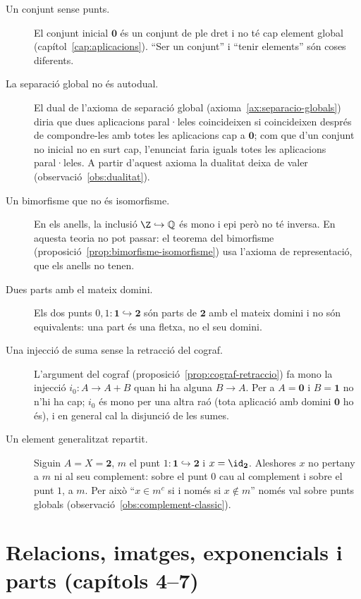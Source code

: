 \begin{description}
\item[Un conjunt sense punts.] El conjunt inicial \(\mathbf0\) és un conjunt
de ple dret i no té cap element global
(capítol~\ref{cap:aplicacions}). \enquote{Ser un conjunt} i \enquote{tenir
elements} són coses diferents.

\item[La separació global no és autodual.] El dual de l'axioma de separació
global (axioma~\ref{ax:separacio-globals}) diria que dues aplicacions
paral·leles coincideixen si coincideixen després de compondre-les amb
totes les aplicacions cap a \(\mathbf0\); com que d'un conjunt no inicial no
en surt cap, l'enunciat faria iguals totes les aplicacions paral·leles. A
partir d'aquest axioma la dualitat deixa de valer
(observació~\ref{obs:dualitat}).

\item[Un bimorfisme que no és isomorfisme.] En els anells, la inclusió
\(\Z\hookrightarrow\mathbb Q\) és mono i epi però no té inversa. En aquesta
teoria no pot passar: el teorema del bimorfisme
(proposició~\ref{prop:bimorfisme-isomorfisme}) usa l'axioma de
representació, que els anells no tenen.

\item[Dues parts amb el mateix domini.] Els dos punts
\(0,1\colon\mathbf1\hookrightarrow\mathbf2\) són parts de \(\mathbf2\) amb el
mateix domini i no són equivalents: una part és una fletxa, no el seu
domini.

\item[Una injecció de suma sense la retracció del cograf.] L'argument del
cograf (proposició~\ref{prop:cograf-retraccio}) fa mono la injecció
\(i_0\colon A\to A+B\) quan hi ha alguna \(B\to A\). Per a \(A=\mathbf0\) i
\(B=\mathbf1\) no n'hi ha cap; \(i_0\) és mono per una altra raó (tota
aplicació amb domini \(\mathbf0\) ho és), i en general cal la disjunció de
les sumes.

\item[Un element generalitzat repartit.] Siguin \(A=X=\mathbf2\), \(m\) el
punt \(1\colon\mathbf1\hookrightarrow\mathbf2\) i \(x=\id_{\mathbf2}\). Aleshores
\(x\) no pertany a \(m\) ni al seu complement: sobre el punt \(0\) cau al
complement i sobre el punt \(1\), a \(m\). Per això \enquote{\(x\in m^c\)
si i només si \(x\notin m\)} només val sobre punts globals
(observació~\ref{obs:complement-classic}).
\end{description}

\section*{Relacions, imatges, exponencials i parts (capítols 4--7)}

